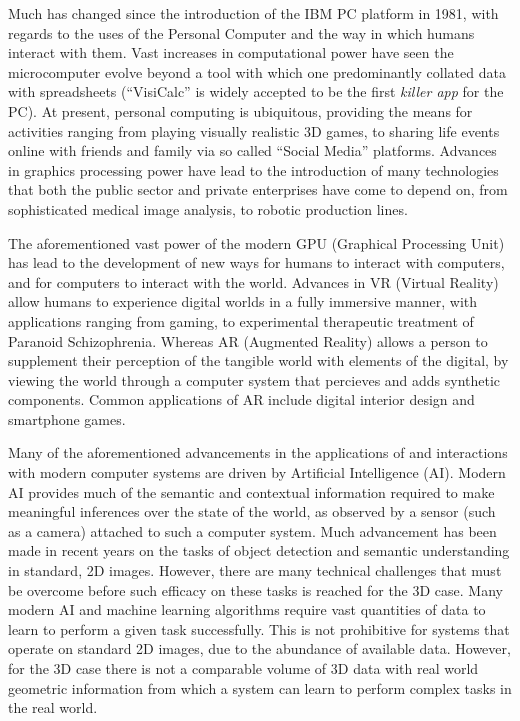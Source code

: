 \label{chap:intro}
Much has changed since the introduction of the IBM PC platform in 1981, with regards to the 
uses of the Personal Computer and the way in which humans interact with them. Vast increases 
in computational power have seen the microcomputer evolve beyond a tool with which one predominantly 
collated data with spreadsheets (``VisiCalc'' is widely accepted to be the first \textit{killer app}
for the PC). At present, personal computing is ubiquitous, providing the means for activities ranging 
from playing visually realistic 3D games, to sharing life events online with friends and family via 
so called ``Social Media'' platforms. Advances in graphics processing power have lead to the introduction 
of many technologies that both the public sector and private enterprises have come to depend on, from 
sophisticated medical image analysis, to robotic production lines.

The aforementioned vast power of the modern GPU (Graphical Processing Unit) has lead to the development 
of new ways for humans to interact with computers, and for computers to interact with the world. Advances 
in VR (Virtual Reality) allow humans to experience digital worlds in a fully immersive manner, with 
applications ranging from gaming, to experimental therapeutic treatment of Paranoid Schizophrenia. 
Whereas AR (Augmented Reality) allows a person to supplement their perception of the tangible world with 
elements of the digital, by viewing the world through a computer system that percieves and adds synthetic 
components. Common applications of AR include digital interior design and smartphone games.

Many of the aforementioned advancements in the applications of and interactions with modern computer 
systems are driven by Artificial Intelligence (AI). Modern AI provides much of the semantic and contextual 
information required to make meaningful inferences over the state of the world, as observed by a sensor 
(such as a camera) attached to such a computer system. Much advancement has been made in recent years on 
the tasks of object detection and semantic understanding in standard, 2D images. However, there are many 
technical challenges that must be overcome before such efficacy on these tasks is reached for the 3D 
case. Many modern AI and machine learning algorithms require vast quantities of data to learn to 
perform a given task successfully. This is not prohibitive for systems that operate on 
standard 2D images, due to the abundance of available data. However, for the 3D case there 
is not a comparable volume of 3D data with real world geometric information from which a system 
can learn to perform complex tasks in the real world.

